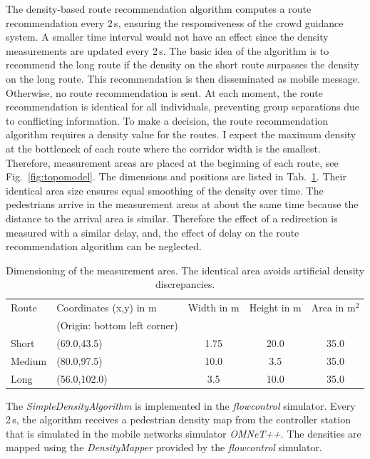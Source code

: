 The density-based route recommendation algorithm computes a route recommendation every 2\,s, ensuring  the responsiveness of the crowd guidance system. A smaller time interval would not have an effect since the density measurements are updated every 2\,s. The basic idea of the algorithm is to recommend the long route if the density on the short route surpasses the density on the long route. This recommendation is then disseminated as mobile message. Otherwise, no route recommendation is sent. At each moment, the route recommendation is identical for all individuals, preventing group separations due to conflicting information. 
To make a decision, the route recommendation algorithm requires a density value for the routes. I expect the maximum density at the bottleneck of each route where the corridor width is the smallest. Therefore, measurement areas  are placed at the beginning of each route, see Fig.~\ref{fig:topomodel}. The dimensions and positions are listed in Tab.~\ref{tab:dimensioning}. Their identical area size ensures equal smoothing of the density over time. The pedestrians arrive in the measurement areas at about the same time because the distance to the arrival area is similar. Therefore the effect of a redirection is measured with a similar delay, and, the effect of delay on the route recommendation algorithm can be neglected.
\begin{table}[hbt!]
\begin{tabular}{llccc}
\hline 
Route &  Coordinates (x,y) in m   & Width in m & Height in m & Area in $\text{m}^2$ \\ 
& (Origin: bottom left corner) & & & \\ \hline
Short & (69.0,43.5) & 1.75 & 20.0 & 35.0 \\ 
Medium & (80.0,97.5) & 10.0 & 3.5 & 35.0 \\ 
Long & (56.0,102.0) & 3.5 & 10.0 & 35.0 \\ 
\hline 
\end{tabular} 
\caption[Dimensioning of the measurement ares]{Dimensioning of the measurement ares. The identical area avoids artificial density discrepancies.  }
\label{tab:dimensioning}
\end{table}

The \textit{SimpleDensityAlgorithm} is implemented in the \textit{flowcontrol} simulator. Every 2\,s, the algorithm receives a pedestrian density map from the controller station that is simulated in the mobile networks simulator \textit{OMNeT++}. The densities are mapped using the \textit{DensityMapper} provided by the \textit{flowcontrol} simulator.



